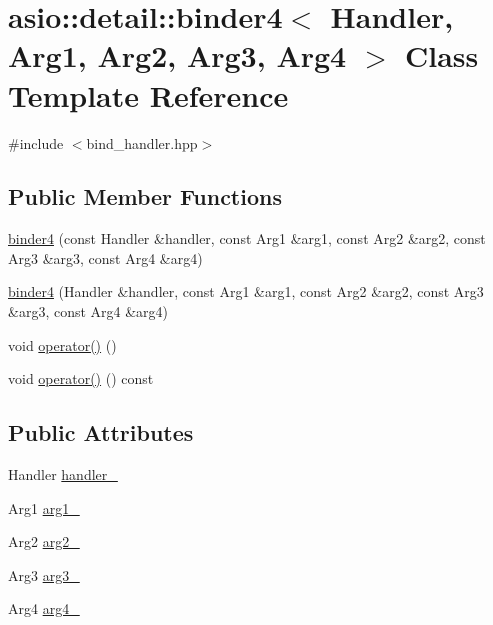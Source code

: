 \hypertarget{classasio_1_1detail_1_1binder4}{}\section{asio\+:\+:detail\+:\+:binder4$<$ Handler, Arg1, Arg2, Arg3, Arg4 $>$ Class Template Reference}
\label{classasio_1_1detail_1_1binder4}


{\ttfamily \#include $<$bind\+\_\+handler.\+hpp$>$}

\subsection*{Public Member Functions}
\begin{DoxyCompactItemize}
\item 
\hyperlink{classasio_1_1detail_1_1binder4_ab970007fd3a9915eb2ff06f7971984f2}{binder4} (const Handler \&handler, const Arg1 \&arg1, const Arg2 \&arg2, const Arg3 \&arg3, const Arg4 \&arg4)
\item 
\hyperlink{classasio_1_1detail_1_1binder4_a00dd61e785ccb0d27bccc5fcc02a7619}{binder4} (Handler \&handler, const Arg1 \&arg1, const Arg2 \&arg2, const Arg3 \&arg3, const Arg4 \&arg4)
\item 
void \hyperlink{classasio_1_1detail_1_1binder4_abaef796ff72735dadbc651795054eac0}{operator()} ()
\item 
void \hyperlink{classasio_1_1detail_1_1binder4_a5d26c3d1e59ac38ce4fe056f2d48969a}{operator()} () const 
\end{DoxyCompactItemize}
\subsection*{Public Attributes}
\begin{DoxyCompactItemize}
\item 
Handler \hyperlink{classasio_1_1detail_1_1binder4_a444a6e0eaaef64627f3de2afda54f35e}{handler\+\_\+}
\item 
Arg1 \hyperlink{classasio_1_1detail_1_1binder4_a7f3b6da29e094c1516c28552c32bd86c}{arg1\+\_\+}
\item 
Arg2 \hyperlink{classasio_1_1detail_1_1binder4_a365e0712430a4dbfaf5dbe92fcb5728e}{arg2\+\_\+}
\item 
Arg3 \hyperlink{classasio_1_1detail_1_1binder4_ac5ae387da705816089fd2e47c35f862a}{arg3\+\_\+}
\item 
Arg4 \hyperlink{classasio_1_1detail_1_1binder4_abfeeba0018be820726c0273129bdcfa3}{arg4\+\_\+}
\end{DoxyCompactItemize}


